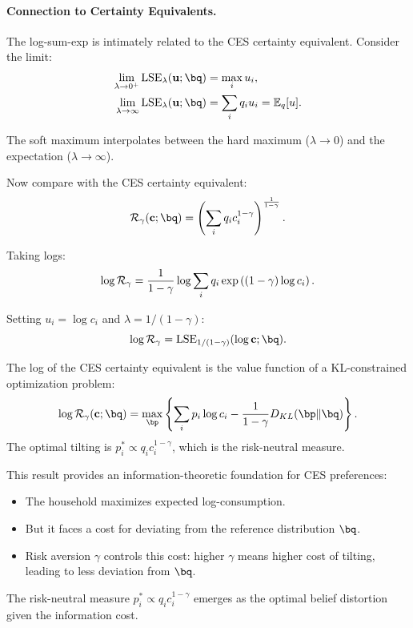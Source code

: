 \paragraph{Connection to Certainty Equivalents.}
The log-sum-exp is intimately related to the CES certainty equivalent. Consider the limit:
\begin{align}
\lim_{\lambda \to 0^+} \text{LSE}_\lambda(\bu; \bq) &= \max_i u_i, \label{eq:ac-adv-lse-limit0} \\
\lim_{\lambda \to \infty} \text{LSE}_\lambda(\bu; \bq) &= \sum_i q_i u_i = \mathbb{E}_q[u]. \label{eq:ac-adv-lse-limitinf}
\end{align}

The soft maximum interpolates between the hard maximum ($\lambda \to 0$) and the expectation ($\lambda \to \infty$).

Now compare with the CES certainty equivalent:
\begin{equation}
\CE_\gamma(\bc; \bq) = \left( \sum_i q_i c_i^{1-\gamma} \right)^{\frac{1}{1-\gamma}}.
\label{eq:ac-adv-ce}
\end{equation}

Taking logs:
\begin{equation}
\log \mathcal{R}_\gamma = \frac{1}{1-\gamma} \log \sum_i q_i \exp\left( (1-\gamma) \log c_i \right).
\label{eq:ac-adv-ce-log}
\end{equation}

Setting $u_i = \log c_i$ and $\lambda = 1/(1-\gamma)$:
\begin{equation}
\log \CE_\gamma = \text{LSE}_{1/(1-\gamma)}(\log \bc; \bq).
\label{eq:ac-adv-ce-lse}
\end{equation}

\begin{proposition}
\label{prop:ac-adv-ces-kl}
The log of the CES certainty equivalent is the value function of a KL-constrained optimization problem:
\begin{equation}
\log \CE_\gamma(\bc; \bq) = \max_{\bp} \left\{ \sum_i p_i \log c_i - \frac{1}{1-\gamma} D_{KL}(\bp \| \bq) \right\}.
\label{eq:ac-adv-ces-kl}
\end{equation}
The optimal tilting is $p_i^* \propto q_i c_i^{1-\gamma}$, which is the risk-neutral measure.
\end{proposition}

\begin{calloutnote}[Interpretation]
This result provides an information-theoretic foundation for CES preferences:
\begin{itemize}[nosep]
\item The household maximizes expected log-consumption.
\item But it faces a cost for deviating from the reference distribution $\bq$.
\item Risk aversion $\gamma$ controls this cost: higher $\gamma$ means higher cost of tilting, leading to less deviation from $\bq$.
\end{itemize}

The risk-neutral measure $p_i^* \propto q_i c_i^{1-\gamma}$ emerges as the optimal belief distortion given the information cost.
\end{calloutnote}

